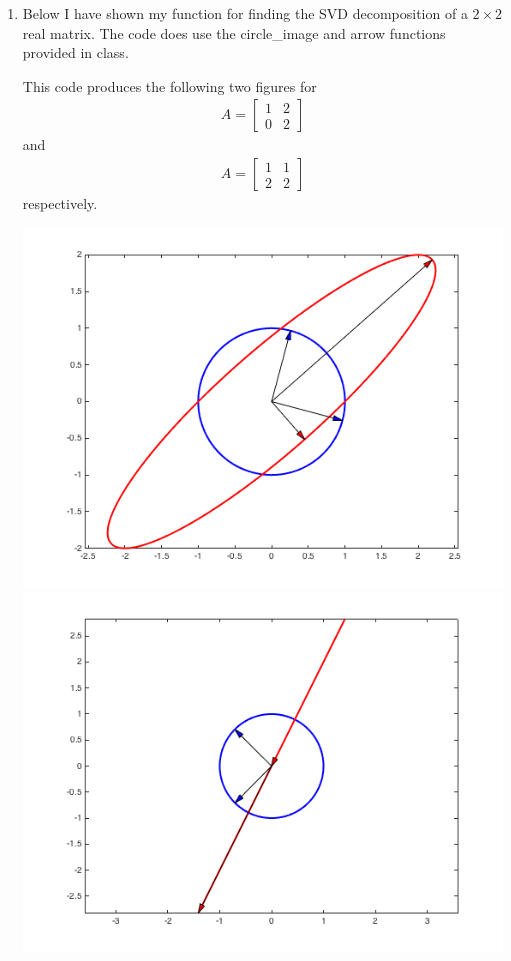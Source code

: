 \documentclass[11pt]{article}
\begin{document}
\begin{enumerate}
    \item %
        Below I have shown my function for finding the SVD decomposition of
        a $2 \times 2$ real matrix. The code does use the circle\_image and arrow
        functions provided in class.

        
        

        This code produces the following two figures
        for
        \begin{align*}
            A =
            \begin{bmatrix}
                1 & 2 \\
                0 & 2
            \end{bmatrix}
        \end{align*}
        and
        \begin{align*}
            A =
            \begin{bmatrix}
                1 & 1 \\
                2 & 2
            \end{bmatrix}
        \end{align*}
        respectively.
        \begin{center}
            \includegraphics[scale=.5]{Figures/01_7_1.png} \\
            \includegraphics[scale=.5]{Figures/01_7_2.png}

\end{center}
\end{enumerate}
\end{document}
